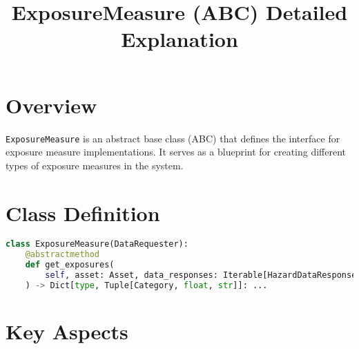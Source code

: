 \documentclass{article}
\title{ExposureMeasure (ABC) Detailed Explanation}
\author{}
\date{}
\begin{document}
\maketitle

\section{Overview}

\texttt{ExposureMeasure} is an abstract base class (ABC) that defines the interface for exposure measure implementations. It serves as a blueprint for creating different types of exposure measures in the system.

\section{Class Definition}

\begin{lstlisting}[language=Python]
class ExposureMeasure(DataRequester):
    @abstractmethod
    def get_exposures(
        self, asset: Asset, data_responses: Iterable[HazardDataResponse]
    ) -> Dict[type, Tuple[Category, float, str]]: ...
\end{lstlisting}

\section{Key Aspects}
\end{document}
